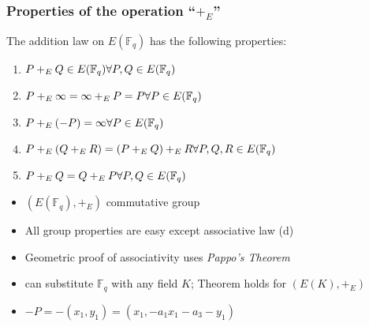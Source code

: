 \documentclass[handout]{beamer}%
\newcommand{\Q}{\mathbb Q}
\newcommand{\F}{\mathbb F}
\newcommand{\C}{\mathbb C}
\theoremstyle{definition}
\begin{document}
\begin{frame}
\frametitle{Properties of the operation ``$+_E$''}

\begin{Theorem}
 The addition law on $E(\F_q)$ has the following
properties:
\begin{enumerate}[<+-| alert@+>][(a)]
 \item $P+_EQ\in E(\F_q)\hfill\forall P,Q\in E(\F_q)$
 \item  $P+_E\infty=\infty+_E P=P\hfill\forall P\in E(\F_q)$
 \item  $P+_E(-P)=\infty\hfill\forall P\in E(\F_q)$
 \item  $P+_E(Q +_E R)=(P+_E Q)+_E R\hfill\forall P,Q,R\in E(\F_q)$
 \item  $P+_E Q=Q +_E P\hfill\forall P,Q\in E(\F_q)$
\end{enumerate}
 \end{Theorem}\pause

\begin{itemize}[<+-| alert@+>]
 \item $\left(E(\F_q),+_E\right)$  \alert{commutative group}
 \item All group properties are easy except \alert{associative law (d)}
 \item Geometric proof of associativity uses \emph{Pappo's Theorem}
 \item can substitute $\F_q$ with any field $K$; Theorem holds for $\left(E(K),+_E\right)$
\item $-P=-(x_1,y_1)=(x_1,-a_1x_1-a_3-y_1)$
\end{itemize}
\end{frame}
\end{document}
